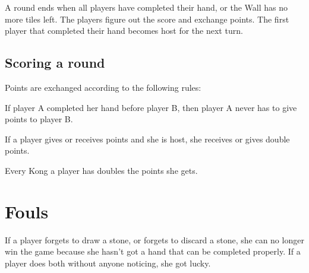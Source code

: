 \documentclass{article}
\begin{document}
A round ends when all players have completed their hand, or the Wall has no more tiles left. The players figure out the score and exchange points. The first player that completed their hand becomes host for the next turn.

\subsection{Scoring a round}
Points are exchanged according to the following rules:
\begin{itemize*}
    \item If player A completed her hand before player B, then player A never has to give points to player B.
    \item If a player gives or receives points and she is host, she receives or gives double points.
    \item Every Kong a player has doubles the points she gets.

\end{itemize*}

\section{Fouls}
If a player forgets to draw a stone, or forgets to discard a stone, she can no longer win the game because she hasn't got a hand that can be completed properly.
If a player does both without anyone noticing, she got lucky.
\end{document}
